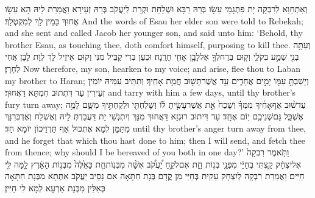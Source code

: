 {וְאִתְחַוַּא לְרִבְקָה יָת פִּתְגָמֵי עֵשָׂו בְּרַהּ רַבָּא וּשְׁלַחַת וּקְרָת לְיַעֲקֹב בְּרַהּ זְעֵירָא וַאֲמַרַת לֵיהּ הָא עֵשָׂו אֲחוּךְ כָּמֵין לָךְ לְמִקְטְלָךְ׃}
{And the words of Esau her elder son were told to Rebekah; and she sent and called Jacob her younger son, and said unto him: ‘Behold, thy brother Esau, as touching thee, doth comfort himself, purposing to kill thee.}{}
{וְעַתָּ֥ה בְנִ֖י שְׁמַ֣ע בְּקֹלִ֑י וְק֧וּם בְּרַח\maqqaf לְךָ֛ אֶל\maqqaf לָבָ֥ן אָחִ֖י חָרָֽנָה׃}
{וּכְעַן בְּרִי קַבֵּיל מִנִּי וְקוּם אִיזֵיל לָךְ לְוָת לָבָן אֲחִי לְחָרָן׃}
{Now therefore, my son, hearken to my voice; and arise, flee thou to Laban my brother to Haran;}{}
{וְיָשַׁבְתָּ֥ עִמּ֖וֹ יָמִ֣ים אֲחָדִ֑ים עַ֥ד אֲשֶׁר\maqqaf תָּשׁ֖וּב חֲמַ֥ת אָחִֽיךָ׃}
{וְתִתֵּיב עִמֵּיהּ יוֹמִין זְעֵירִין עַד דִּתְתוּב חִמְתָּא דַּאֲחוּךְ׃}
{and tarry with him a few days, until thy brother’s fury turn away;}{}
{עַד\maqqaf שׁ֨וּב אַף\maqqaf אָחִ֜יךָ מִמְּךָ֗ וְשָׁכַח֙ אֵ֣ת אֲשֶׁר\maqqaf עָשִׂ֣יתָ לּ֔וֹ וְשָׁלַחְתִּ֖י וּלְקַחְתִּ֣יךָ מִשָּׁ֑ם לָמָ֥ה אֶשְׁכַּ֛ל גַּם\maqqaf שְׁנֵיכֶ֖ם י֥וֹם אֶחָֽד׃}
{עַד דִּיתוּב רוּגְזָא דַּאֲחוּךְ מִנָּךְ וְיִתְנְשֵׁי יָת דַּעֲבַדְתְּ לֵיהּ וְאֶשְׁלַח וְאֶדְבְּרִנָּךְ מִתַּמָּן לְמָא אֶתְכּוּל אַף תַּרְוֵיכוֹן יוֹמָא חַד׃}
{until thy brother’s anger turn away from thee, and he forget that which thou hast done to him; then I will send, and fetch thee from thence; why should I be bereaved of you both in one day?’}{}
{וַתֹּ֤אמֶר רִבְקָה֙ אֶל\maqqaf יִצְחָ֔ק \footnotesize{קַ֣}צְתִּי בְחַיַּ֔י מִפְּנֵ֖י בְּנ֣וֹת חֵ֑ת אִם\maqqaf לֹקֵ֣חַ יַ֠עֲקֹ֠ב אִשָּׁ֨ה מִבְּנֽוֹת\maqqaf חֵ֤ת כָּאֵ֙לֶּה֙ מִבְּנ֣וֹת הָאָ֔רֶץ לָ֥מָּה לִּ֖י חַיִּֽים׃}
{וַאֲמַרַת רִבְקָה לְיִצְחָק עַקִית בְּחַיַּי מִן קֳדָם בְּנָת חִתָּאָה אִם נָסֵיב יַעֲקֹב אִתְּתָא מִבְּנָת חִתָּאָה כְּאִלֵּין מִבְּנָת אַרְעָא לְמָא לִי חַיִּין׃}
